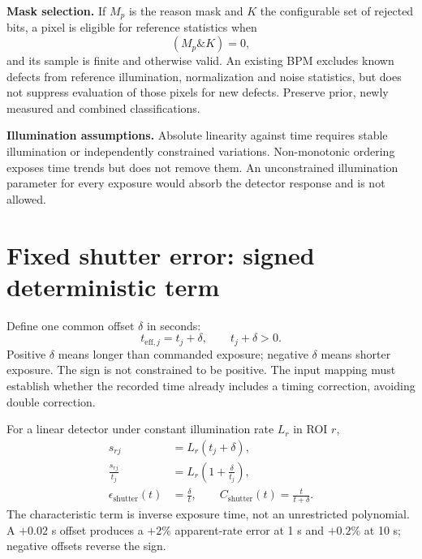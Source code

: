 \documentclass[11pt,a4paper]{article}
\newcommand{\key}[1]{\textbf{\color{ink}#1}}
\newcommand{\nextpage}{\clearpage}
\begin{document}
\key{Mask selection.} If $M_p$ is the reason mask and $K$ the configurable set of rejected bits, a pixel is eligible for reference statistics when
\begin{equation}(M_p\mathbin{\&}K)=0,\end{equation}
and its sample is finite and otherwise valid. An existing BPM excludes known defects from reference illumination, normalization and noise statistics, but does not suppress evaluation of those pixels for new defects. Preserve prior, newly measured and combined classifications.

\key{Illumination assumptions.} Absolute linearity against time requires stable illumination or independently constrained variations. Non-monotonic ordering exposes time trends but does not remove them. An unconstrained illumination parameter for every exposure would absorb the detector response and is not allowed.

\nextpage
\section{Fixed shutter error: signed deterministic term}
Define one common offset $\delta$ in seconds:
\begin{equation}\boxed{t_{\mathrm{eff},j}=t_j+\delta},\qquad t_j+\delta>0.\end{equation}
Positive $\delta$ means longer than commanded exposure; negative $\delta$ means shorter exposure. The sign is not constrained to be positive. The input mapping must establish whether the recorded time already includes a timing correction, avoiding double correction.

For a linear detector under constant illumination rate $L_r$ in ROI $r$,
\begin{align}
s_{rj}&=L_r(t_j+\delta),\\
\boxed{\frac{s_{rj}}{t_j}}&=\boxed{L_r\left(1+\frac{\delta}{t_j}\right)},\\
\epsilon_{\mathrm{shutter}}(t)&=\frac{\delta}{t},\qquad
C_{\mathrm{shutter}}(t)=\frac{t}{t+\delta}.
\end{align}
The characteristic term is inverse exposure time, not an unrestricted polynomial. A $+0.02$ s offset produces a $+2\%$ apparent-rate error at 1 s and $+0.2\%$ at 10 s; negative offsets reverse the sign.
\end{document}
